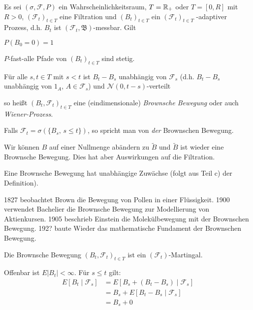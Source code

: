 \documentclass[a4paper,twoside,DIV15,BCOR12mm]{scrbook}
\newcommand{\cF}{\mathcal F}
\newcommand{\borel}{{\mathfrak B}}
\begin{document}
\begin{definition}
Es sei $(\sigma,\cF,P)$ ein Wahrscheinlichkeitsraum, $T=\mathbb{R}_+$ oder $T=[0,R]$ mit $R>0$, $(\cF_t)_{t\in T}$ eine Filtration und $(B_t)_{t\in T}$ ein $(\cF_t)_{t\in T}$
-adaptiver Prozess, d.h. $B_t$ ist $(\cF_t,\borel)$-messbar. Gilt 
\begin{enuma}
\item $P(B_0=0)=1$
\item $P$-fast-alle Pfade von $(B_t)_{t\in T}$ sind stetig.
\item Für alle $s,t\in T$ mit $s<t$ ist $B_t-B_s$ unabhängig von $\cF_s$ (d.h. $B_t-B_s$ unabhängig von $1_A$, $A\in \cF_s$) und $\mathcal N(0,t-s)$-verteilt
\end{enuma}
so heißt $(B_t,\cF_t)_{t\in T}$ eine (eindimensionale) \emph{Brownsche Bewegung} oder auch \emph{Wiener-Prozess}.
\end{definition}

\begin{bemerkung}
\begin{enuma}
\item Falls $\cF_t = \sigma(\{B_s,\, s\le t\})$, so spricht man von \emph{der} Brownschen Bewegung.
\item Wir können $B$ auf einer Nullmenge abändern zu $\tilde B$ und $\tilde B$ ist wieder eine Brownsche Bewegung. Dies hat aber Auswirkungen auf die Filtration.
\item Eine Brownsche Bewegung hat unabhängige Zuwächse (folgt aus Teil c) der Definition).
\item 1827 beobachtet Brown die Bewegung von Pollen in einer Flüssigkeit. 1900 verwendet Bachelier die Brownsche Bewegung zur Modellierung von Aktienkursen. 1905 beschrieb Einstein die Molekülbewegung mit der Brownschen Bewegung. 192? baute Wieder das mathematische Fundament der Brownschen Bewegung.
\end{enuma}
\end{bemerkung}

\begin{lemma}
Die Brownsche Bewegung $(B_t,\cF_t)_{t\in T}$ ist ein $(\cF_t)$-Martingal.
\end{lemma}

\begin{beweis}
Offenbar ist $E|B_t|<\infty$. Für $s\le t$ gilt:
\begin{align*}
E[B_t\mid \cF_s] &= E[B_s + (B_t - B_s) \mid \cF_s] \\
&= B_s + E[B_t-B_s \mid \cF_s] \\
&= B_s + 0
\end{align*}
\end{beweis}
\end{document}

